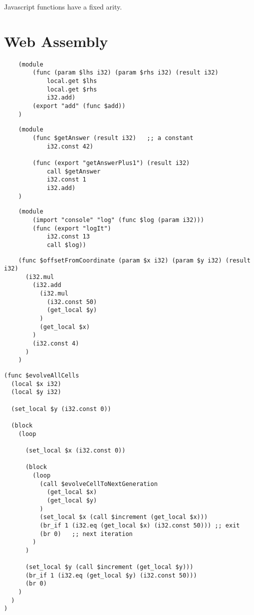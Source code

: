 Javascript functions have a fixed arity.





\section{Web Assembly}

{\small
\begin{verbatim}
    (module
        (func (param $lhs i32) (param $rhs i32) (result i32)
            local.get $lhs
            local.get $rhs
            i32.add)
        (export "add" (func $add))
    )
\end{verbatim}
}

{\small
\begin{verbatim}
    (module
        (func $getAnswer (result i32)   ;; a constant
            i32.const 42)

        (func (export "getAnswerPlus1") (result i32)
            call $getAnswer
            i32.const 1
            i32.add)
    )
\end{verbatim}
}


{\small
\begin{verbatim}
    (module
        (import "console" "log" (func $log (param i32)))
        (func (export "logIt")
            i32.const 13
            call $log))
\end{verbatim}
}




{\small
\begin{verbatim}
    (func $offsetFromCoordinate (param $x i32) (param $y i32) (result i32)
      (i32.mul
        (i32.add
          (i32.mul
            (i32.const 50)
            (get_local $y)
          )
          (get_local $x)
        )
        (i32.const 4)
      )
    )
\end{verbatim}
}





{\small
\begin{verbatim}
(func $evolveAllCells
  (local $x i32)
  (local $y i32)

  (set_local $y (i32.const 0))

  (block
    (loop

      (set_local $x (i32.const 0))

      (block
        (loop
          (call $evolveCellToNextGeneration
            (get_local $x)
            (get_local $y)
          )
          (set_local $x (call $increment (get_local $x)))
          (br_if 1 (i32.eq (get_local $x) (i32.const 50))) ;; exit
          (br 0)   ;; next iteration
        )
      )

      (set_local $y (call $increment (get_local $y)))
      (br_if 1 (i32.eq (get_local $y) (i32.const 50)))
      (br 0)
    )
  )
)
\end{verbatim}
}





